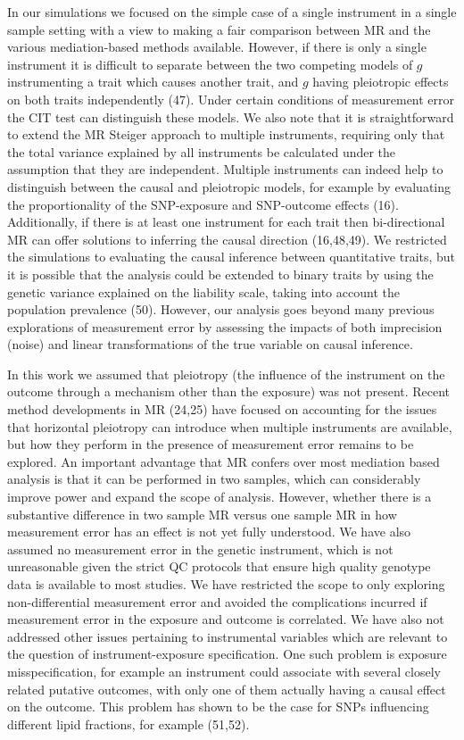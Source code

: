 \documentclass[]{article}
\begin{document}
In our simulations we focused on the simple case of a single instrument
in a single sample setting with a view to making a fair comparison
between MR and the various mediation-based methods available. However,
if there is only a single instrument it is difficult to separate between
the two competing models of \(g\) instrumenting a trait which causes
another trait, and \(g\) having pleiotropic effects on both traits
independently (47). Under certain conditions of measurement error the
CIT test can distinguish these models. We also note that it is
straightforward to extend the MR Steiger approach to multiple
instruments, requiring only that the total variance explained by all
instruments be calculated under the assumption that they are
independent. Multiple instruments can indeed help to distinguish between
the causal and pleiotropic models, for example by evaluating the
proportionality of the SNP-exposure and SNP-outcome effects (16).
Additionally, if there is at least one instrument for each trait then
bi-directional MR can offer solutions to inferring the causal direction
(16,48,49). We restricted the simulations to evaluating the causal
inference between quantitative traits, but it is possible that the
analysis could be extended to binary traits by using the genetic
variance explained on the liability scale, taking into account the
population prevalence (50). However, our analysis goes beyond many
previous explorations of measurement error by assessing the impacts of
both imprecision (noise) and linear transformations of the true variable
on causal inference.

In this work we assumed that pleiotropy (the influence of the instrument
on the outcome through a mechanism other than the exposure) was not
present. Recent method developments in MR (24,25) have focused on
accounting for the issues that horizontal pleiotropy can introduce when
multiple instruments are available, but how they perform in the presence
of measurement error remains to be explored. An important advantage that
MR confers over most mediation based analysis is that it can be
performed in two samples, which can considerably improve power and
expand the scope of analysis. However, whether there is a substantive
difference in two sample MR versus one sample MR in how measurement
error has an effect is not yet fully understood. We have also assumed no
measurement error in the genetic instrument, which is not unreasonable
given the strict QC protocols that ensure high quality genotype data is
available to most studies. We have restricted the scope to only
exploring non-differential measurement error and avoided the
complications incurred if measurement error in the exposure and outcome
is correlated. We have also not addressed other issues pertaining to
instrumental variables which are relevant to the question of
instrument-exposure specification. One such problem is exposure
misspecification, for example an instrument could associate with several
closely related putative outcomes, with only one of them actually having
a causal effect on the outcome. This problem has shown to be the case
for SNPs influencing different lipid fractions, for example (51,52).
\end{document}
